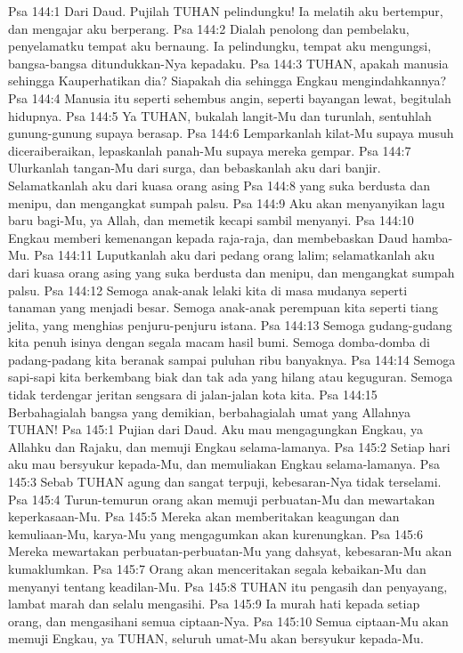 Psa 144:1  Dari Daud. Pujilah TUHAN pelindungku! Ia melatih aku bertempur, dan mengajar aku berperang.
Psa 144:2  Dialah penolong dan pembelaku, penyelamatku tempat aku bernaung. Ia pelindungku, tempat aku mengungsi, bangsa-bangsa ditundukkan-Nya kepadaku.
Psa 144:3  TUHAN, apakah manusia sehingga Kauperhatikan dia? Siapakah dia sehingga Engkau mengindahkannya?
Psa 144:4  Manusia itu seperti sehembus angin, seperti bayangan lewat, begitulah hidupnya.
Psa 144:5  Ya TUHAN, bukalah langit-Mu dan turunlah, sentuhlah gunung-gunung supaya berasap.
Psa 144:6  Lemparkanlah kilat-Mu supaya musuh diceraiberaikan, lepaskanlah panah-Mu supaya mereka gempar.
Psa 144:7  Ulurkanlah tangan-Mu dari surga, dan bebaskanlah aku dari banjir. Selamatkanlah aku dari kuasa orang asing
Psa 144:8  yang suka berdusta dan menipu, dan mengangkat sumpah palsu.
Psa 144:9  Aku akan menyanyikan lagu baru bagi-Mu, ya Allah, dan memetik kecapi sambil menyanyi.
Psa 144:10  Engkau memberi kemenangan kepada raja-raja, dan membebaskan Daud hamba-Mu.
Psa 144:11  Luputkanlah aku dari pedang orang lalim; selamatkanlah aku dari kuasa orang asing yang suka berdusta dan menipu, dan mengangkat sumpah palsu.
Psa 144:12  Semoga anak-anak lelaki kita di masa mudanya seperti tanaman yang menjadi besar. Semoga anak-anak perempuan kita seperti tiang jelita, yang menghias penjuru-penjuru istana.
Psa 144:13  Semoga gudang-gudang kita penuh isinya dengan segala macam hasil bumi. Semoga domba-domba di padang-padang kita beranak sampai puluhan ribu banyaknya.
Psa 144:14  Semoga sapi-sapi kita berkembang biak dan tak ada yang hilang atau keguguran. Semoga tidak terdengar jeritan sengsara di jalan-jalan kota kita.
Psa 144:15  Berbahagialah bangsa yang demikian, berbahagialah umat yang Allahnya TUHAN!
Psa 145:1  Pujian dari Daud. Aku mau mengagungkan Engkau, ya Allahku dan Rajaku, dan memuji Engkau selama-lamanya.
Psa 145:2  Setiap hari aku mau bersyukur kepada-Mu, dan memuliakan Engkau selama-lamanya.
Psa 145:3  Sebab TUHAN agung dan sangat terpuji, kebesaran-Nya tidak terselami.
Psa 145:4  Turun-temurun orang akan memuji perbuatan-Mu dan mewartakan keperkasaan-Mu.
Psa 145:5  Mereka akan memberitakan keagungan dan kemuliaan-Mu, karya-Mu yang mengagumkan akan kurenungkan.
Psa 145:6  Mereka mewartakan perbuatan-perbuatan-Mu yang dahsyat, kebesaran-Mu akan kumaklumkan.
Psa 145:7  Orang akan menceritakan segala kebaikan-Mu dan menyanyi tentang keadilan-Mu.
Psa 145:8  TUHAN itu pengasih dan penyayang, lambat marah dan selalu mengasihi.
Psa 145:9  Ia murah hati kepada setiap orang, dan mengasihani semua ciptaan-Nya.
Psa 145:10  Semua ciptaan-Mu akan memuji Engkau, ya TUHAN, seluruh umat-Mu akan bersyukur kepada-Mu.
